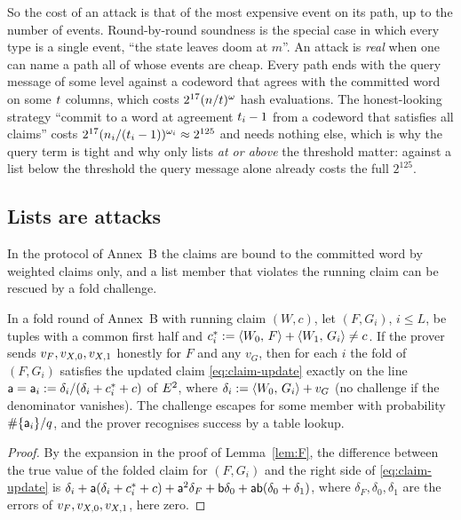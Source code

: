 So the cost of an attack is that of the most expensive event on its path, up to the number of events. Round-by-round soundness is the special case in which every type is a single event, ``the state leaves doom at $m$''. An attack is \emph{real} when one can name a path all of whose events are cheap. Every path ends with the query message of some level against a codeword that agrees with the committed word on some $t$ columns, which costs $2^{17}(n/t)^{\omega}$ hash evaluations. The honest-looking strategy ``commit to a word at agreement $t_i-1$ from a codeword that satisfies all claims'' costs $2^{17}(n_i/(t_i-1))^{\omega_i}\approx2^{125}$ and needs nothing else, which is why the query term is tight and why only lists \emph{at or above} the threshold matter: against a list below the threshold the query message alone already costs the full $2^{125}$.

\subsection{Lists are attacks}\label{sec:listattack}

In the protocol of Annex~B the claims are bound to the committed word by weighted claims only, and a list member that violates the running claim can be rescued by a fold challenge.

\begin{lemma}\label{lem:lines}
In a fold round of Annex~B with running claim $(W,c)$, let $(F,G_i)$, $i\le L$, be tuples with a common first half and $c_i^\ast:=\langle W_0,\, F \rangle+\langle W_1,\, G_i \rangle\ne c$. If the prover sends $v_F,v_{X,0},v_{X,1}$ honestly for $F$ and any $v_G$, then for each $i$ the fold of $(F,G_i)$ satisfies the updated claim \eqref{eq:claim-update} exactly on the line $\mathsf{a}=\mathsf{a}_i:=\delta_i/(\delta_i+c_i^\ast+c)$ of $E^2$, where $\delta_i:=\langle W_0,\, G_i \rangle+v_G$ (no challenge if the denominator vanishes). The challenge escapes for some member with probability $\#\{\mathsf{a}_i\}/q$, and the prover recognises success by a table lookup.
\end{lemma}
\begin{proof}
By the expansion in the proof of Lemma~\ref{lem:F}, the difference between the true value of the folded claim for $(F,G_i)$ and the right side of \eqref{eq:claim-update} is $\delta_i+\mathsf{a}(\delta_i+c_i^\ast+c)+\mathsf{a}^2\delta_F+\mathsf{b}\delta_0+\mathsf{a}\mathsf{b}(\delta_0+\delta_1)$, where $\delta_F,\delta_0,\delta_1$ are the errors of $v_F,v_{X,0},v_{X,1}$, here zero.
\end{proof}

